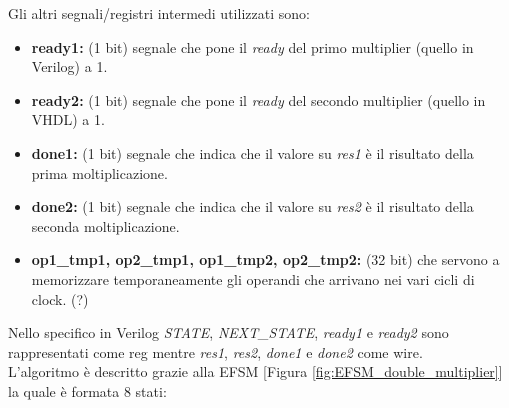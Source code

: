 \documentclass[]{IEEEtran}
\begin{document}
Gli altri segnali/registri intermedi utilizzati sono:
\begin{itemize}
    \item \textbf{ready1:} (1 bit) segnale che pone il \textit{ready} del primo multiplier (quello in Verilog) a 1.
    \item \textbf{ready2:} (1 bit) segnale che pone il \textit{ready} del secondo multiplier (quello in VHDL) a 1.
    \item \textbf{done1:} (1 bit) segnale che indica che il valore su \textit{res1} è il risultato della prima moltiplicazione.
    \item \textbf{done2:} (1 bit) segnale che indica che il valore su \textit{res2} è il risultato della seconda moltiplicazione.
    \item \textbf{op1\_tmp1, op2\_tmp1, op1\_tmp2, op2\_tmp2:} (32 bit) che servono a memorizzare temporaneamente gli operandi che arrivano nei vari cicli di clock. (?)
\end{itemize}

Nello specifico in Verilog \textit{STATE}, \textit{NEXT\_STATE}, \textit{ready1} e \textit{ready2} sono rappresentati come reg mentre \textit{res1}, \textit{res2}, \textit{done1} e \textit{done2} come wire.
\\L'algoritmo è descritto grazie alla EFSM [Figura \ref{fig:EFSM_double_multiplier}] la quale è formata 8 stati:
\end{document}
